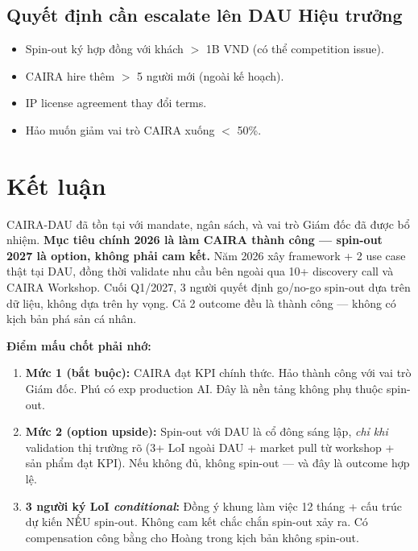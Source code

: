 \documentclass[11pt,a4paper]{article}
\begin{document}
\subsection{Quyết định cần escalate lên DAU Hiệu trưởng}

\begin{itemize}
\item Spin-out ký hợp đồng với khách $>$ 1B VND (có thể competition issue).
\item CAIRA hire thêm $>$ 5 người mới (ngoài kế hoạch).
\item IP license agreement thay đổi terms.
\item Hảo muốn giảm vai trò CAIRA xuống $<$ 50\%.
\end{itemize}

\clearpage

\section*{Kết luận}

\begin{keybox}[title=Một đoạn tóm tắt]
CAIRA-DAU đã tồn tại với mandate, ngân sách, và vai trò Giám đốc đã được bổ
nhiệm. \textbf{Mục tiêu chính 2026 là làm CAIRA thành công --- spin-out 2027
là option, không phải cam kết.} Năm 2026 xây framework + 2 use case thật tại
DAU, đồng thời validate nhu cầu bên ngoài qua 10+ discovery call và CAIRA
Workshop. Cuối Q1/2027, 3 người quyết định go/no-go spin-out dựa trên dữ liệu,
không dựa trên hy vọng. Cả 2 outcome đều là thành công --- không có kịch bản
phá sản cá nhân.
\end{keybox}

\textbf{Điểm mấu chốt phải nhớ:}

\begin{enumerate}
\item \textbf{Mức 1 (bắt buộc):} CAIRA đạt KPI chính thức. Hảo thành công với
vai trò Giám đốc. Phú có exp production AI. Đây là nền tảng không phụ thuộc
spin-out.

\item \textbf{Mức 2 (option upside):} Spin-out với DAU là cổ đông sáng lập,
\textit{chỉ khi} validation thị trường rõ (3+ LoI ngoài DAU + market pull từ
workshop + sản phẩm đạt KPI). Nếu không đủ, không spin-out --- và đây là
outcome hợp lệ.

\item \textbf{3 người ký LoI \textit{conditional}:} Đồng ý khung làm việc 12
tháng + cấu trúc dự kiến NẾU spin-out. Không cam kết chắc chắn spin-out xảy
ra. Có compensation công bằng cho Hoàng trong kịch bản không spin-out.
\end{enumerate}
\end{document}
